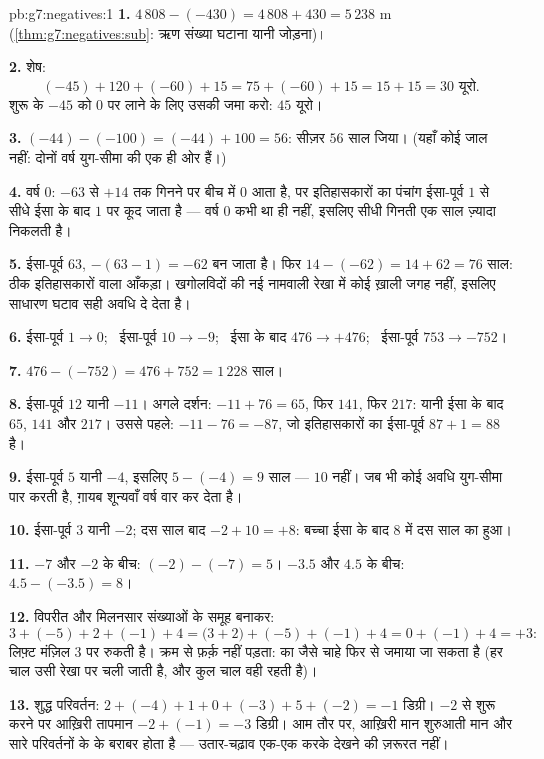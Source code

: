 \begin{solution}{pb:g7:negatives:1}
\textbf{1.} $4\,808 - (-430) = 4\,808 + 430 = 5\,238$ m
(\cref{thm:g7:negatives:sub}: ऋण संख्या घटाना यानी
जोड़ना)।

\textbf{2.} शेष:
\[
(-45) + 120 + (-60) + 15 = 75 + (-60) + 15 = 15 + 15 = 30
\text{ यूरो}.
\]
शुरू के $-45$ को $0$ पर लाने के लिए उसकी  जमा करो:
$45$ यूरो।

\textbf{3.} $(-44) - (-100) = (-44) + 100 = 56$: सीज़र
$56$ साल जिया। (यहाँ कोई जाल नहीं: दोनों वर्ष युग-सीमा की एक ही
ओर हैं।)

\textbf{4.} वर्ष $0$: $-63$ से $+14$ तक गिनने पर बीच में
$0$ आता है, पर इतिहासकारों का पंचांग ईसा-पूर्व $1$ से सीधे ईसा
के बाद $1$ पर कूद जाता है --- वर्ष $0$ कभी था ही नहीं, इसलिए
सीधी गिनती एक साल ज़्यादा निकलती है।

\textbf{5.} ईसा-पूर्व $63$, $-(63 - 1) = -62$ बन जाता है। फिर
$14 - (-62) = 14 + 62 = 76$ साल: ठीक इतिहासकारों वाला
आँकड़ा। खगोलविदों की नई नामवाली रेखा में कोई ख़ाली जगह नहीं,
इसलिए साधारण घटाव सही अवधि दे देता है।

\textbf{6.} ईसा-पूर्व $1 \to 0$; \ ईसा-पूर्व $10 \to -9$; \ ईसा
के बाद $476 \to +476$; \ ईसा-पूर्व $753 \to -752$।

\textbf{7.} $476 - (-752) = 476 + 752 = 1\,228$ साल।

\textbf{8.} ईसा-पूर्व $12$ यानी $-11$। अगले दर्शन:
$-11 + 76 = 65$, फिर $141$, फिर $217$: यानी ईसा के बाद $65$,
$141$ और $217$। उससे पहले: $-11 - 76 = -87$, जो इतिहासकारों का
ईसा-पूर्व $87 + 1 = 88$ है।

\textbf{9.} ईसा-पूर्व $5$ यानी $-4$, इसलिए $5 - (-4) = 9$ साल
--- $10$ नहीं। जब भी कोई अवधि युग-सीमा पार करती है, ग़ायब
शून्यवाँ वर्ष वार कर देता है।

\textbf{10.} ईसा-पूर्व $3$ यानी $-2$; दस साल बाद $-2 + 10 = +8$:
बच्चा ईसा के बाद $8$ में दस साल का हुआ।

\textbf{11.} $-7$ और $-2$ के बीच: $(-2) - (-7) = 5$।
$-3.5$ और $4.5$ के बीच: $4.5 - (-3.5) = 8$।

\textbf{12.} विपरीत और मिलनसार संख्याओं के समूह बनाकर:
\[
3 + (-5) + 2 + (-1) + 4
= \bigl(3 + 2\bigr) + (-5) + (-1) + 4
= 0 + (-1) + 4 = +3 :
\]
लिफ़्ट मंज़िल $3$ पर रुकती है। क्रम से फ़र्क़ नहीं पड़ता:  का  जैसे चाहे फिर से जमाया जा सकता है (हर चाल उसी
रेखा पर चली जाती है, और कुल चाल वही रहती है)।

\textbf{13.} शुद्ध परिवर्तन:
$2 + (-4) + 1 + 0 + (-3) + 5 + (-2) = -1$ डिग्री। $-2$ से शुरू
करने पर आख़िरी तापमान $-2 + (-1) = -3$ डिग्री। आम तौर पर,
आख़िरी मान शुरुआती मान और सारे परिवर्तनों के  के बराबर होता
है --- उतार-चढ़ाव एक-एक करके देखने की ज़रूरत नहीं।


\end{solution}
